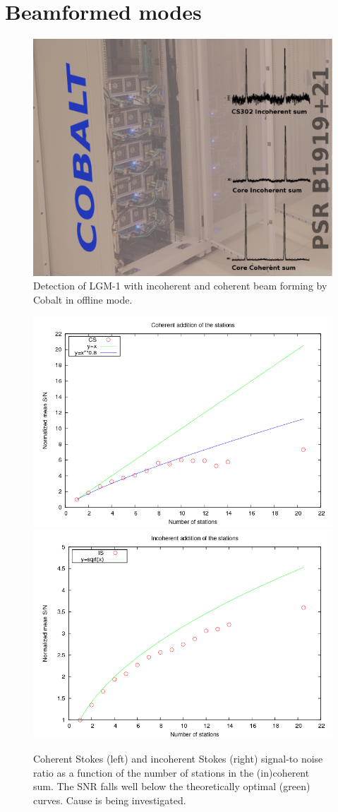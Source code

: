\documentclass[a4paper,twoside, 10pt]{report}
\newcommand{\cobalt}{Cobalt\xspace}
\begin{document}
\chapter{Beamformed modes}


\begin{figure}
  \begin{center}
    \includegraphics[width=\columnwidth]{dailyimage-20140206-cobalt-offline-pulsar.png}
  \end{center}
  \caption{Detection of LGM-1 with incoherent and coherent beam
    forming by \cobalt in offline mode.}
  \label{fig:lgm-1}
\end{figure}


\begin{figure}
  \begin{center}
    \includegraphics[width=0.48\columnwidth]{cs-snr-vs-stations-2014-07-08.png}%
    \includegraphics[width=0.48\columnwidth]{is-snr-vs-stations-2014-07-08.png}
  \end{center}
  \caption{Coherent Stokes (left) and incoherent Stokes (right)
    signal-to noise ratio as a function of the number of stations in
    the (in)coherent sum. The SNR falls well below the theoretically
    optimal (green) curves. Cause is being investigated.}
  \label{fig:cs-is-snr-scaling}
\end{figure}
\end{document}
